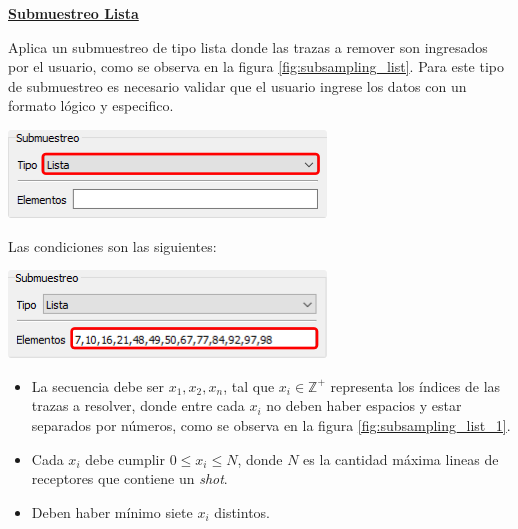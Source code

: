 \documentclass[12pt,twoside,letter]{ol-softwaremanual}
\newenvironment{Figure}
  {\par\medskip\noindent\minipage{\linewidth}}
  {\endminipage\par\medskip}
\begin{document}
\underline{\textbf{Submuestreo Lista}}

\begin{multicols}{2}

Aplica un submuestreo de tipo lista donde las trazas a remover son ingresados por el usuario, como se observa en la figura \ref{fig:subsampling_list}. Para este tipo de submuestreo es necesario validar que el usuario ingrese los datos con un formato lógico y especifico.

\begin{Figure}
    \vspace{5mm}
    \centering
    \includegraphics[width=0.8\linewidth]{subsampling-list.png}
    \label{fig:subsampling_list}
\end{Figure}

\end{multicols}

Las condiciones son las siguientes:

\begin{multicols}{2}

\begin{Figure}
	\vspace{5mm}
	\centering
	\includegraphics[width=1\linewidth]{subsampling-list-1.png}
	\label{fig:subsampling_list_1}
\end{Figure}

\begin{itemize}
	\setlength\itemsep{0em}
    \item La secuencia debe ser $x_1,x_2,x_n$, tal que $x_i \in \mathbb{Z}^+$ representa los índices de las trazas a resolver, donde entre cada $x_i$ no deben haber espacios y estar separados por números, como se observa en la figura \ref{fig:subsampling_list_1}.
    \item Cada $x_i$ debe cumplir $0 \leq x_i \leq N$, donde $N$ es la cantidad máxima lineas de receptores que contiene un \emph{shot}.
    \item Deben haber mínimo siete $x_i$ distintos.
\end{itemize}

\end{multicols}
\end{document}
